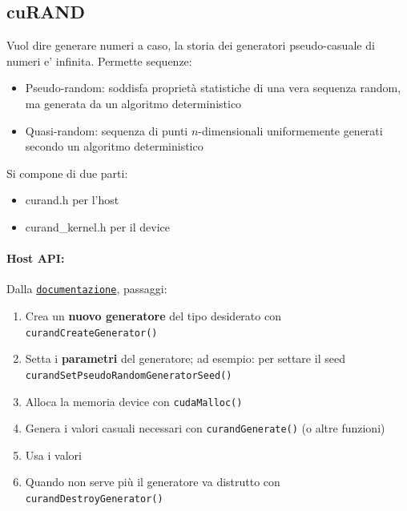 \subsection{cuRAND}
Vuol dire generare numeri a caso, la storia dei generatori pseudo-casuale di numeri e' infinita. 
Permette sequenze: 
\begin{itemize}
	\item Pseudo-random: soddisfa proprietà statistiche di una vera sequenza random, ma generata da un algoritmo deterministico
	
	\item Quasi-random: sequenza di punti $n$-dimensionali uniformemente generati secondo un algoritmo deterministico
\end{itemize}

Si compone di due parti:
\begin{itemize}
    \item curand.h per l'host
    \item curand\_kernel.h per il device
\end{itemize}

\paragraph{Host API:} Dalla \href{https://docs.nvidia.com/cuda/curand/index.html}{\texttt{documentazione}}, passaggi:
\begin{enumerate}
	\item Crea un \textbf{nuovo generatore} del tipo desiderato con \texttt{curandCreateGenerator()}
	
	\item Setta i \textbf{parametri} del generatore; ad esempio: per settare il seed \texttt{curandSetPseudoRandomGeneratorSeed()}
	
	\item Alloca la memoria device con \texttt{cudaMalloc()}
	
	\item Genera i valori casuali necessari con \texttt{curandGenerate()} (o altre funzioni)
	
	\item Usa i valori
	
	\item Quando non serve più il generatore va distrutto con \texttt{curandDestroyGenerator()}
\end{enumerate}

